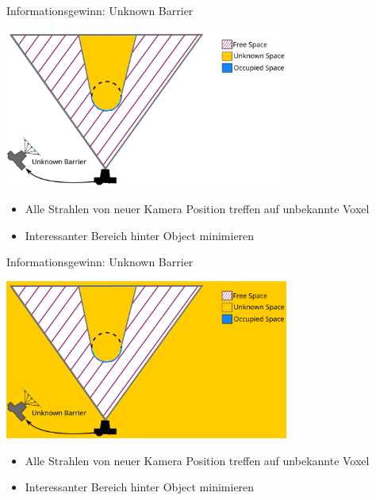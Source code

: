 \documentclass{beamer}
\begin{document}
\begin{frame}{Informationsgewinn: Unknown Barrier}
	\begin{block}{}
		\begin{center}
			\includegraphics[width=0.7\textwidth]{Graphics/unknown_barrier_vscott_1.png}
		\end{center}
		\begin{itemize}
			\item Alle Strahlen von neuer Kamera Position treffen auf unbekannte Voxel
			\item Interessanter Bereich hinter Object minimieren
		\end{itemize}
	\end{block}
\end{frame}

\begin{frame}{Informationsgewinn: Unknown Barrier}
	\begin{block}{}
		\begin{center}
			\includegraphics[width=0.7\textwidth]{Graphics/unknown_barrier_vscott_2.png}
		\end{center}
		\begin{itemize}
			\item Alle Strahlen von neuer Kamera Position treffen auf unbekannte Voxel
			\item Interessanter Bereich hinter Object minimieren
		\end{itemize}
	\end{block}
\end{frame}
\end{document}
